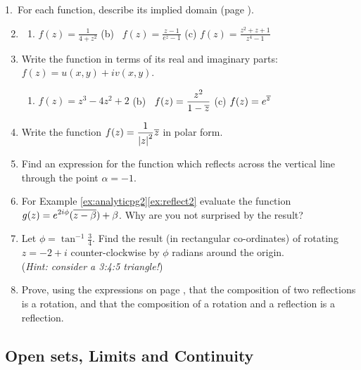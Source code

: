 \begin{exercises*}
\hangindent\leftmargini
\textup{1.}\ For each function, describe its implied domain (page \pageref{sec:func}).
\begin{enumerate}\setcounter{enumi}{1}
  \item[]\begin{enumerate}
    \item $\displaystyle f(z)=\frac 1{4+z^2}$\qquad
    (b) \ $\displaystyle f(z)=\frac{z-1}{e^z-1}$\qquad
    (c) $\displaystyle f(z)=\frac{z^2+z+1}{z^4-1}$
  \end{enumerate}
  
  \item Write the function in terms of its real and imaginary parts: $f(z)=u(x,y)+iv(x,y)$.
  \begin{enumerate}
  	\item $\displaystyle f(z)=z^3-4z^2+2$\qquad
    (b) \ $\displaystyle f(z)=\frac{z^2}{1-\overline{z}}$\qquad
    (c) $\displaystyle f(z)=e^{\overline{z}}$
  \end{enumerate}
  
  \item Write the function $\displaystyle f(z)=\frac 1{\left| z\right|^2}\overline{z}$ in polar form.
  
  \item Find an expression for the function which reflects across the vertical line through the point $\alpha=-1$.
  
  \item For Example \hyperref[ex:reflect2]{\ref*{ex:analyticpg2}\ref*{ex:reflect2}} evaluate the function $\displaystyle g(z)=e^{2i\phi}(\overline{z-\beta})+\beta$. Why are you not surprised by the result?
  
  \item Let $\phi=\tan^{-1}\frac 34$. Find the result (in rectangular co-ordinates) of rotating $z=-2+i$ counter-clockwise by $\phi$ radians around the origin.\\
  (\emph{Hint: consider a 3:4:5 triangle!})
  
  \item Prove, using the expressions on page \pageref{pg:2dgeom}, that the composition of two reflections is a rotation, and that the composition of a rotation and a reflection is a reflection.
\end{enumerate}
\end{exercises*}
\clearpage

\subsection{Open sets, Limits and Continuity}

